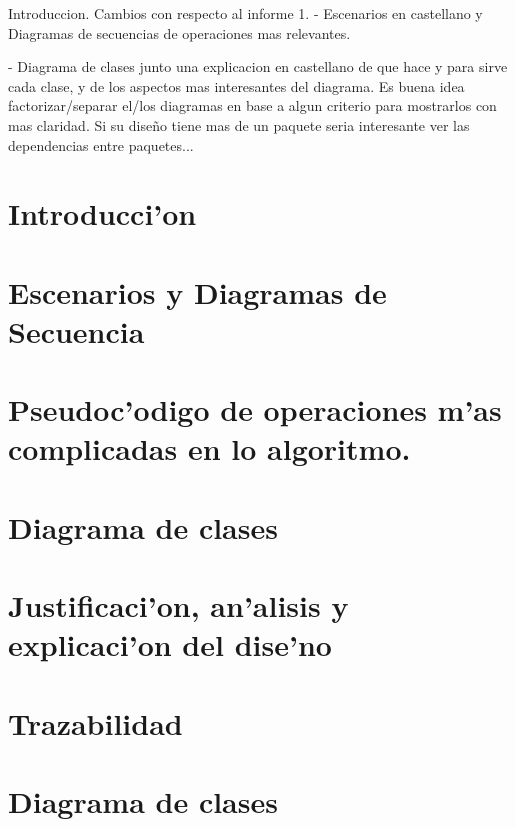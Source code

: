 \documentclass[spanish, a4paper, 10pt, titlepage]{article}
\author{Echevarr'ia - Farjat - Freijo - Giusto}
\begin{document}

\tableofcontents
\clearpage


Introduccion. Cambios con respecto al informe 1.
- Escenarios en castellano y Diagramas de secuencias de operaciones mas relevantes.

- Diagrama de clases junto una explicacion en castellano de que hace y para sirve cada clase, y de los aspectos mas interesantes del diagrama. Es buena idea factorizar/separar el/los diagramas en base a algun criterio para mostrarlos con mas claridad. Si su diseño tiene mas de un paquete seria interesante ver las dependencias entre paquetes...


\section{Introducci'on}

\clearpage
 
\section{Escenarios y Diagramas de Secuencia}

\clearpage

\section{Pseudoc'odigo de operaciones m'as complicadas en lo algoritmo.}



\section{Diagrama de clases}

\clearpage

\section{Justificaci'on, an'alisis y explicaci'on del dise'no}

\clearpage

\section{Trazabilidad}

\clearpage

\section{Diagrama de clases}

\clearpage
\end{document}
